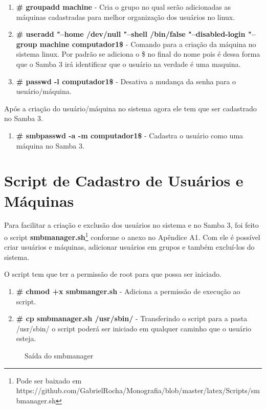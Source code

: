 \begin{enumerate}
	\item \textbf{\# groupadd machine} - Cria o grupo no qual serão adicionadas as máquinas cadastradas para melhor organização dos usuários no linux.
	\item \textbf{\# useradd "--home /dev/null "--shell /bin/false "--disabled-login "--group machine computador1\$} - 	Comando para a criação da máquina no sistema linux. Por padrão se adiciona o \$ no final do nome pois é dessa forma que o Samba 3 irá identificar que o usuário na verdade é uma maquina. 
	\item \textbf{\# passwd -l computador1\$} - Desativa a mudança da senha para o usuário/máquina.
\end{enumerate}

Após a criação do usuário/máquina no sistema agora ele tem que ser cadastrado no Samba 3.

\begin{enumerate}	
	\item \textbf{\# smbpasswd -a -m computador1\$} - Cadastra o usuário como uma máquina no Samba 3.
\end{enumerate}


\section{Script de Cadastro de Usuários e Máquinas}

Para facilitar a criação e exclusão dos usuários no sistema e no Samba 3, foi feito o script \textbf{smbmanager.sh}\footnote[1]{Pode ser baixado em https://github.com/GabrielRocha/Monografia/blob/master/latex/Scripts/smbmanager.sh} conforme o anexo no Apêndice A1. Com ele é possível criar usuários e máquinas, adicionar usuários em grupos e também excluí-los do sistema.

O script tem que ter a permissão de root para que possa ser iniciado.

\begin{enumerate}
	\item \textbf{\# chmod +x smbmanger.sh} - Adiciona a permissão de execução ao script.
	\item \textbf{\# cp smbmanager.sh /usr/sbin/} - Transferindo o script para a pasta /usr/sbin/ o script poderá ser iniciado em qualquer caminho que o usuário esteja.
\end{enumerate}

\begin{figure}[ht]
   	\centering
   	\caption{Saída do smbmanager}
    \label{smbmanager}
\end{figure}

